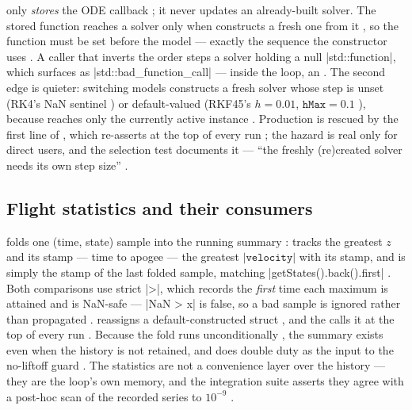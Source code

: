 \begin{keyinsight}
 only \emph{stores} the ODE callback
; it never updates an already-built solver. The stored function
reaches a solver only when  constructs a fresh one from it
, so the function must be set before the model --- exactly the
sequence the  constructor uses . A caller that
inverts the order steps a solver holding a null \cppinline|std::function|, which surfaces as
\cppinline|std::bad_function_call| --- inside the loop, an . The second
edge is quieter: switching models constructs a fresh solver whose step is unset (RK4's NaN
sentinel ) or default-valued (RKF45's $h=0.01$, $\mathtt{hMax}=0.1$
), because  reaches only the currently
active instance . Production is rescued by the first line of
, which re-asserts  at the top of every run
; the hazard is real only for direct  users, and
the selection test documents it --- ``the freshly (re)created solver needs its own step size''
.
\end{keyinsight}

\subsection{Flight statistics and their consumers}\label{sec:simcore-stats}

 folds one (time, state) sample into the running summary
:  tracks the greatest $z$ and
 its stamp --- time to apogee ---  the greatest
$\lvert\mathtt{velocity}\rvert$ with its stamp, and  is simply the stamp of
the last folded sample, matching \cppinline|getStates().back().first|
. Both comparisons use strict \cppinline|>|, which records
the \emph{first} time each maximum is attained and is NaN-safe --- \cppinline|NaN > x| is false,
so a bad sample is ignored rather than propagated .
 reassigns a default-constructed struct , and
the  calls it at the top of every run . Because the
fold runs unconditionally , the summary exists even when the history
is not retained, and  does double duty as the input to the no-liftoff guard
. The statistics are not a convenience layer over the history ---
they are the loop's own memory, and the integration suite asserts they agree with a post-hoc
scan of the recorded series to $10^{-9}$ .

